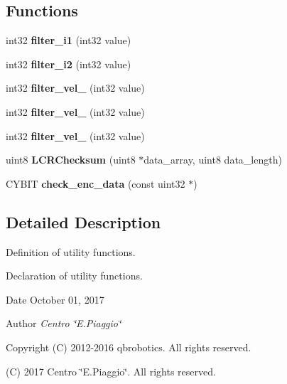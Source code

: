 \subsection*{Functions}
\begin{DoxyCompactItemize}
\item 
\mbox{\label{utils_8h_a3588bc1aa14c6ea245387dda7eb7ffbe}} 
int32 {\bfseries filter\+\_\+i1} (int32 value)
\item 
\mbox{\label{utils_8h_ac9c746215432427ee4e8d7dbb84b1c1a}} 
int32 {\bfseries filter\+\_\+i2} (int32 value)
\item 
\mbox{\label{utils_8h_ad378840ee71c2d41d2d4f1a84465c7f3}} 
int32 {\bfseries filter\+\_\+vel\+\_} (int32 value)
\item 
\mbox{\label{utils_8h_abda54d76e676bb1cb27b5577bd0fe099}} 
int32 {\bfseries filter\+\_\+vel\+\_} (int32 value)
\item 
\mbox{\label{utils_8h_a70430ee90ed28e4c9fca0c4ca3d6583e}} 
int32 {\bfseries filter\+\_\+vel\+\_} (int32 value)
\item 
\mbox{\label{utils_8h_a6205a6e88f72f4cc321a7d8abca23e26}} 
uint8 {\bfseries L\+C\+R\+Checksum} (uint8 $\ast$data\+\_\+array, uint8 data\+\_\+length)
\item 
\mbox{\label{utils_8h_a8f6aff189d5fbbb0be1fdd13e0e720c0}} 
C\+Y\+B\+IT {\bfseries check\+\_\+enc\+\_\+data} (const uint32 $\ast$)
\end{DoxyCompactItemize}


\subsection{Detailed Description}
Definition of utility functions. 

Declaration of utility functions.

\begin{DoxyDate}{Date}
October 01, 2017 
\end{DoxyDate}
\begin{DoxyAuthor}{Author}
{\itshape Centro \char`\"{}\+E.\+Piaggio\char`\"{}} 
\end{DoxyAuthor}
\begin{DoxyCopyright}{Copyright}
(C) 2012-\/2016 qbrobotics. All rights reserved. 

(C) 2017 Centro \char`\"{}\+E.\+Piaggio\char`\"{}. All rights reserved. 
\end{DoxyCopyright}
